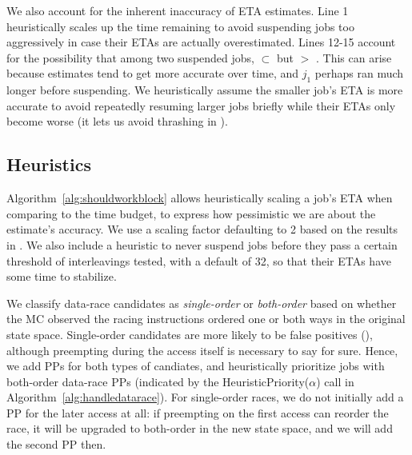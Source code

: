 %
We also account for the inherent inaccuracy of ETA estimates.
Line 1 heuristically scales up the time remaining to avoid suspending jobs too aggressively
in case their ETAs are actually overestimated.
Lines 12-15 account for the
possibility that among two suspended jobs,
 $\subset$ 
but
 $>$ .
This can arise because estimates tend to get more accurate over time,
and $j_1$ perhaps ran much longer before suspending.
We heuristically assume the smaller job's ETA is more accurate
to avoid repeatedly resuming larger jobs briefly while their ETAs only become worse
(it lets us avoid thrashing in \quicksand).


\subsection{Heuristics}
Algorithm~\ref{alg:shouldworkblock} allows heuristically scaling a job's ETA when comparing to the time budget,
to express how pessimistic we are about the estimate's accuracy.
We use a scaling factor defaulting to 2 based on the results in \cite{estimation}.
We also include a heuristic to
never suspend jobs before they pass a certain threshold of interleavings tested,
with a default of 32,
so that their ETAs have some time to stabilize.

We classify data-race candidates as {\em single-order} or {\em both-order} \cite{portend}
based on whether the MC observed the racing instructions ordered one or both ways in the original state space.
Single-order candidates are more likely to be false positives (\sect{\ref{sec:overview-dr}}),
although preempting during the access itself is necessary to say for sure.
Hence, we add PPs for both types of candiates, and heuristically prioritize jobs with both-order data-race PPs
(indicated by the HeuristicPriority($\alpha$) call in Algorithm~\ref{alg:handledatarace}).
For single-order races, we do not initially add a PP for the later access at all:
if preempting on the first access can reorder the race, it will be upgraded to both-order in the new state space, and we will add the second PP then.
